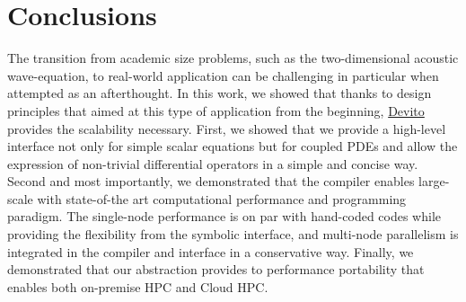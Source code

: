 \documentclass[conference]{IEEEtran}
\begin{document}
\section{Conclusions}\label{conclusions}

The transition from academic size problems, such as the two-dimensional
acoustic wave-equation, to real-world application can be challenging in
particular when attempted as an afterthought. In this work, we showed
that thanks to design principles that aimed at this type of application
from the beginning, \href{https://github.com/devitocodes/devito}{Devito}
provides the scalability necessary. First, we showed that we provide a
high-level interface not only for simple scalar equations but for
coupled PDEs and allow the expression of non-trivial differential
operators in a simple and concise way. Second and most importantly, we
demonstrated that the compiler enables large-scale with state-of-the art
computational performance and programming paradigm. The single-node
performance is on par with hand-coded codes while providing the
flexibility from the symbolic interface, and multi-node parallelism is
integrated in the compiler and interface in a conservative way. Finally,
we demonstrated that our abstraction provides to performance portability
that enables both on-premise HPC and Cloud HPC.



\end{document}
